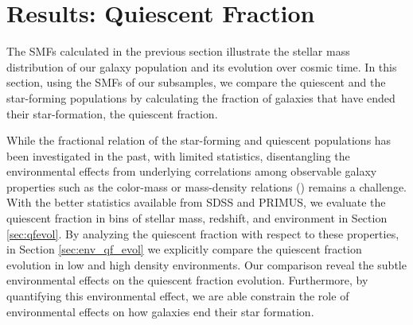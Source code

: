 \section{Results: Quiescent Fraction} \label{sec:qf_const}
The SMFs calculated in the previous section illustrate the stellar
mass distribution of our galaxy population and its evolution over
cosmic time. In this section, using the SMFs of our subsamples, we
compare the quiescent and the star-forming populations by calculating
the fraction of galaxies that have ended their star-formation, the quiescent fraction. 

While the fractional relation of the star-forming and quiescent
populations has been investigated in the past, with limited
statistics, disentangling the environmental effects from underlying
correlations among observable galaxy properties such as the color-mass
or mass-density relations (\citealt{Cooper:2010aa}) remains a 
challenge. With the better statistics available from SDSS and
PRIMUS, we evaluate the quiescent fraction in bins of stellar mass,
redshift, and environment in Section \ref{sec:qfevol}. By analyzing
the quiescent fraction with respect to these properties, in Section
\ref{sec:env_qf_evol} we explicitly compare the quiescent fraction
evolution in low and high density environments. Our comparison reveal
the subtle environmental effects on the quiescent fraction
evolution. Furthermore, by quantifying this environmental effect, we
are able constrain the role of environmental effects on how galaxies
end their star formation.
